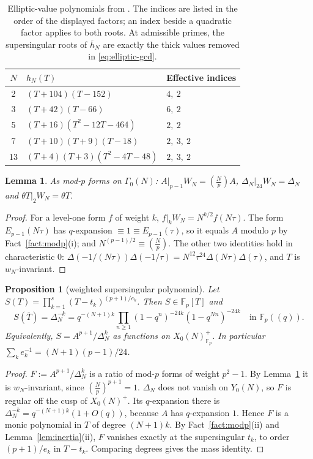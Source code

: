 \documentclass[11pt,a4paper]{article}
\numberwithin{equation}{section}
\newtheorem{proposition}[theorem]{Proposition}
\newtheorem{lemma}[theorem]{Lemma}
\theoremstyle{definition}
\theoremstyle{remark}
\newcommand{\Fp}{\mathbb F_p}
\newcommand{\Lp}[1]{\left(\frac{#1}{p}\right)}
\begin{document}
\begin{table}[htbp]\centering
\begin{tabular}{cll}\toprule
$N$ & $h_N(T)$ & Effective indices\\\midrule
2 & $(T+104)(T-152)$ & $4,\ 2$\\
3 & $(T+42)(T-66)$ & $6,\ 2$\\
5 & $(T+16)(T^2-12T-464)$ & $2,\ 2$\\
7 & $(T+10)(T+9)(T-18)$ & $2,\ 3,\ 2$\\
13 & $(T+4)(T+3)(T^2-4T-48)$ & $2,\ 3,\ 2$\\\bottomrule
\end{tabular}
\caption{Elliptic-value polynomials from \citet{JST19}.
The indices are listed in the order of the displayed factors; an index
beside a quadratic factor applies to both roots. At admissible primes,
the supersingular roots of $\overline h_N$ are exactly the thick values
removed in \eqref{eq:elliptic-gcd}.}
\label{tab:elliptic-values}
\end{table}

\begin{lemma}\label{lem:AW}
As mod-$p$ forms on $\Gamma_0(N)$: $A|_{p-1}W_N=\Lp{N}A$, $\Delta_N|_{24}W_N=\Delta_N$ and
$\theta T|_2W_N=\theta T$.
\end{lemma}
\begin{proof}
For a level-one form $f$ of weight $k$, $f|_kW_N=N^{k/2}f(N\tau)$. The form $E_{p-1}(N\tau)$ has
$q$-expansion $\equiv1\equiv E_{p-1}(\tau)$, so it equals $A$ modulo $p$ by Fact~\ref{fact:modp}(i);
and $N^{(p-1)/2}\equiv\Lp N$. The other two identities hold in characteristic $0$:
$\Delta(-1/(N\tau))\Delta(-1/\tau)=N^{12}\tau^{24}\Delta(N\tau)\Delta(\tau)$, and $T$ is
$w_N$-invariant.
\end{proof}

\begin{proposition}[weighted supersingular polynomial]\label{prop:S}
Let $S(T)=\prod_{k=1}^s(T-t_k)^{(p+1)/e_k}$. Then $S\in\Fp[T]$ and
\[
S(\overline T)=\Delta_N^{-k}=q^{-(N+1)k}\prod_{n\ge1}(1-q^n)^{-24k}(1-q^{Nn})^{-24k}\quad\text{in }\Fp((q)).
\]
Equivalently, $S=A^{p+1}/\Delta_N^{k}$ as functions on $X_0(N)^+_{\Fp}$. In particular
$\sum_k e_k^{-1}=(N+1)(p-1)/24$.
\end{proposition}
\begin{proof}
$F:=A^{p+1}/\Delta_N^k$ is a ratio of mod-$p$ forms of weight $p^2-1$. By Lemma~\ref{lem:AW} it is
$w_N$-invariant, since $\Lp N^{p+1}=1$. $\Delta_N$ does not vanish on $Y_0(N)$, so $F$ is regular off the cusp of
$X_0(N)^+$. Its $q$-expansion there is $\Delta_N^{-k}=q^{-(N+1)k}(1+O(q))$, because $A$ has
$q$-expansion $1$. Hence $F$ is a monic polynomial in $T$ of degree $(N+1)k$. By
Fact~\ref{fact:modp}(ii) and Lemma~\ref{lem:inertia}(ii), $F$ vanishes exactly at the supersingular
$t_k$, to order $(p+1)/e_k$ in $T-t_k$. Comparing degrees gives the mass identity.
\end{proof}
\end{document}
